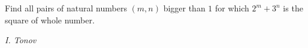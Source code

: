 Find all pairs of natural numbers $(m,n)$ bigger than $1$ for which $2^m+3^n$ is the square of whole number.

\textit{I. Tonov}